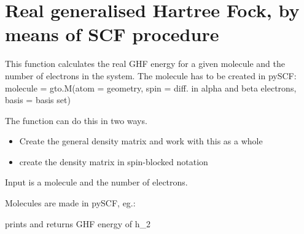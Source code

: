 \documentclass[letterpaper,10pt,english]{sphinxmanual}
\begin{document}
\label{\detokenize{real_GHF:module-ghf.real_GHF}}

\chapter{Real generalised Hartree Fock, by means of SCF procedure}
\label{\detokenize{real_GHF:real-generalised-hartree-fock-by-means-of-scf-procedure}}\label{\detokenize{real_GHF::doc}}
This function calculates the real GHF energy for a given molecule and the number of electrons in the system.
The molecule has to be created in pySCF:
molecule = gto.M(atom = geometry, spin = diff. in alpha and beta electrons, basis = basis set)

The function can do this in two ways.
\begin{itemize}
\item {} 
Create the general density matrix and work with this as a whole

\item {} 
create the density matrix in spin-blocked notation

\end{itemize}

\begin{fulllineitems}
\label{\detokenize{real_GHF:ghf.real_GHF.real_GHF}}
Input is a molecule and the number of electrons.

Molecules are made in pySCF, eg.:

\begin{sphinxVerbatim}[commandchars=\\\{\}]
          
 
\end{sphinxVerbatim}

prints and returns GHF energy of h\_2

\end{fulllineitems}
\end{document}

